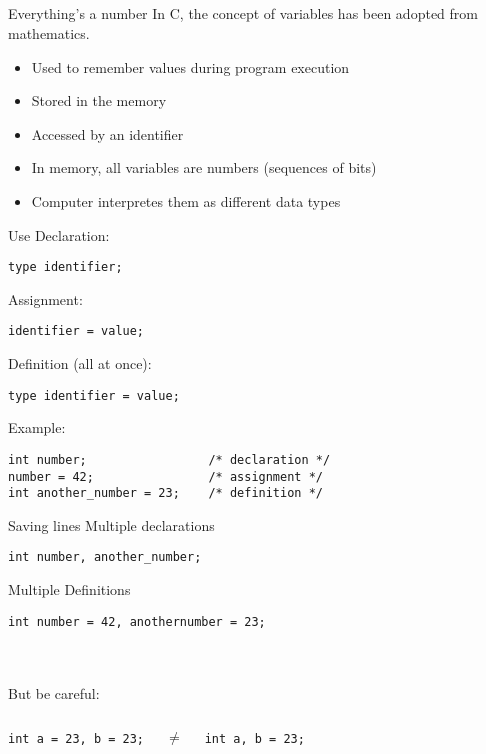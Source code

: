 \subsection{}
\begin{frame}{Everything's a number}
	In C, the concept of variables has been adopted from mathematics.
	\begin{itemize}
		\item Used to remember values during program execution
		\item Stored in the memory
		\item Accessed by an identifier
		\item In memory, all variables are numbers (sequences of bits)
		\item Computer interpretes them as different data types
	\end{itemize}
\end{frame}
\begin{frame}[fragile]{Use}
	Declaration:
	\begin{lstlisting}[numbers=none,basicstyle=\itshape\footnotesize]
type identifier;
\end{lstlisting}
	Assignment: 
	\begin{lstlisting}[numbers=none,basicstyle=\itshape\footnotesize]
identifier = value;
\end{lstlisting}
	Definition (all at once):
	\begin{lstlisting}[numbers=none,basicstyle=\itshape\footnotesize]
type identifier = value;
\end{lstlisting}
	Example:
	\begin{lstlisting}[numbers=none]
int number;					/* declaration */
number = 42;				/* assignment */
int another_number = 23;	/* definition */

\end{lstlisting}
\end{frame}
\begin{frame}[fragile]{Saving lines}
	Multiple declarations
	\begin{lstlisting}[numbers=none]
int number, another_number;
\end{lstlisting}
	Multiple Definitions
	\begin{lstlisting}[numbers=none]
int number = 42, anothernumber = 23;
\end{lstlisting}\ \\\ \\
But be careful:
\begin{columns}[c]
	\begin{lstlisting}[numbers=none]
int a = 23, b = 23;
\end{lstlisting}
	\centering
	$\neq$
	\begin{lstlisting}[numbers=none]
int a, b = 23;
\end{lstlisting}
	
\end{columns}
\end{frame}
